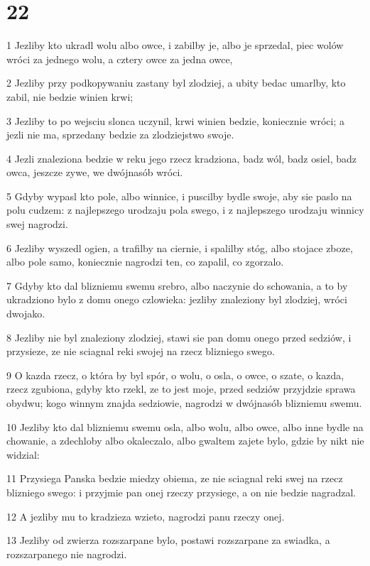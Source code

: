 \chapter{22}

\par 1 Jezliby kto ukradl wolu albo owce, i zabilby je, albo je sprzedal, piec wolów wróci za jednego wolu, a cztery owce za jedna owce,
\par 2 Jezliby przy podkopywaniu zastany byl zlodziej, a ubity bedac umarlby, kto zabil, nie bedzie winien krwi;
\par 3 Jezliby to po wejsciu slonca uczynil, krwi winien bedzie, koniecznie wróci; a jezli nie ma, sprzedany bedzie za zlodziejstwo swoje.
\par 4 Jezli znaleziona bedzie w reku jego rzecz kradziona, badz wól, badz osiel, badz owca, jeszcze zywe, we dwójnasób wróci.
\par 5 Gdyby wypasl kto pole, albo winnice, i puscilby bydle swoje, aby sie paslo na polu cudzem: z najlepszego urodzaju pola swego, i z najlepszego urodzaju winnicy swej nagrodzi.
\par 6 Jezliby wyszedl ogien, a trafilby na ciernie, i spalilby stóg, albo stojace zboze, albo pole samo, koniecznie nagrodzi ten, co zapalil, co zgorzalo.
\par 7 Gdyby kto dal blizniemu swemu srebro, albo naczynie do schowania, a to by ukradziono bylo z domu onego czlowieka: jezliby znaleziony byl zlodziej, wróci dwojako.
\par 8 Jezliby nie byl znaleziony zlodziej, stawi sie pan domu onego przed sedziów, i przysieze, ze nie sciagnal reki swojej na rzecz blizniego swego.
\par 9 O kazda rzecz, o która by byl spór, o wolu, o osla, o owce, o szate, o kazda, rzecz zgubiona, gdyby kto rzekl, ze to jest moje, przed sedziów przyjdzie sprawa obydwu; kogo winnym znajda sedziowie, nagrodzi w dwójnasób blizniemu swemu.
\par 10 Jezliby kto dal blizniemu swemu osla, albo wolu, albo owce, albo inne bydle na chowanie, a zdechloby albo okaleczalo, albo gwaltem zajete bylo, gdzie by nikt nie widzial:
\par 11 Przysiega Panska bedzie miedzy obiema, ze nie sciagnal reki swej na rzecz blizniego swego: i przyjmie pan onej rzeczy przysiege, a on nie bedzie nagradzal.
\par 12 A jezliby mu to kradzieza wzieto, nagrodzi panu rzeczy onej.
\par 13 Jezliby od zwierza rozszarpane bylo, postawi rozszarpane za swiadka, a rozszarpanego nie nagrodzi.
